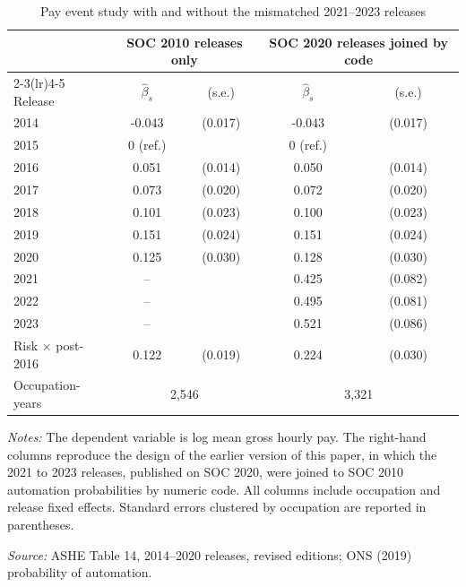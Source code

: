 \begin{table}[!ht]\centering
\caption{Pay event study with and without the mismatched 2021--2023 releases}\label{tab:contam}
\begin{threeparttable}\footnotesize\setlength{\tabcolsep}{4pt}
\begin{tabular}{lcccc}\toprule
 & \multicolumn{2}{c}{SOC 2010 releases only} & \multicolumn{2}{c}{SOC 2020 releases joined by code} \\
\cmidrule(lr){2-3}\cmidrule(lr){4-5}
Release & $\hat{\beta}_{s}$ & (s.e.) & $\hat{\beta}_{s}$ & (s.e.) \\ \midrule
2014 & -0.043 & (0.017) & -0.043 & (0.017) \\
2015 & 0 (ref.) &  & 0 (ref.) &  \\
2016 & 0.051 & (0.014) & 0.050 & (0.014) \\
2017 & 0.073 & (0.020) & 0.072 & (0.020) \\
2018 & 0.101 & (0.023) & 0.100 & (0.023) \\
2019 & 0.151 & (0.024) & 0.151 & (0.024) \\
2020 & 0.125 & (0.030) & 0.128 & (0.030) \\
2021 & -- &  & 0.425 & (0.082) \\
2022 & -- &  & 0.495 & (0.081) \\
2023 & -- &  & 0.521 & (0.086) \\
\addlinespace
Risk $\times$ post-2016 & 0.122 & (0.019) & 0.224 & (0.030) \\
Occupation-years & \multicolumn{2}{c}{2,546} & \multicolumn{2}{c}{3,321} \\
\bottomrule\end{tabular}
\begin{tablenotes}\footnotesize
\item \emph{Notes:} The dependent variable is log mean gross hourly pay. The right-hand columns reproduce the design of the earlier version of this paper, in which the 2021 to 2023 releases, published on SOC 2020, were joined to SOC 2010 automation probabilities by numeric code. All columns include occupation and release fixed effects. Standard errors clustered by occupation are reported in parentheses.
\item \emph{Source:} ASHE Table 14, 2014--2020 releases, revised editions; ONS (2019) probability of automation.
\end{tablenotes}\end{threeparttable}\end{table}